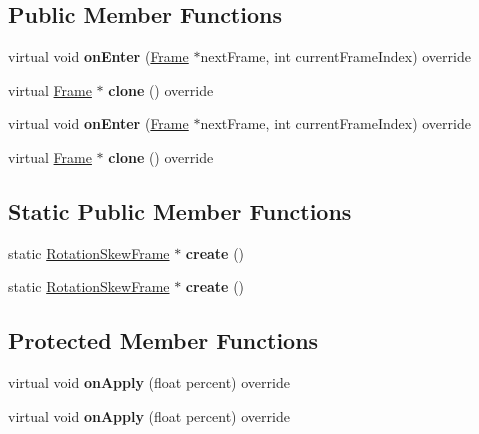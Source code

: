 \subsection*{Public Member Functions}
\begin{DoxyCompactItemize}
\item 
\mbox{\label{classRotationSkewFrame_a8557ecb6480104386fc7bae96d6990a8}} 
virtual void {\bfseries on\+Enter} (\hyperlink{classFrame}{Frame} $\ast$next\+Frame, int current\+Frame\+Index) override
\item 
\mbox{\label{classRotationSkewFrame_a4693ecc28a212a06f3c65157ee5cf5d1}} 
virtual \hyperlink{classFrame}{Frame} $\ast$ {\bfseries clone} () override
\item 
\mbox{\label{classRotationSkewFrame_a608836b94d9d31580a8bfa9494816508}} 
virtual void {\bfseries on\+Enter} (\hyperlink{classFrame}{Frame} $\ast$next\+Frame, int current\+Frame\+Index) override
\item 
\mbox{\label{classRotationSkewFrame_a02f67718cf4e0adaf988641a7cdcbe68}} 
virtual \hyperlink{classFrame}{Frame} $\ast$ {\bfseries clone} () override
\end{DoxyCompactItemize}
\subsection*{Static Public Member Functions}
\begin{DoxyCompactItemize}
\item 
\mbox{\label{classRotationSkewFrame_ac32558effacb66c619fe702d53de0025}} 
static \hyperlink{classRotationSkewFrame}{Rotation\+Skew\+Frame} $\ast$ {\bfseries create} ()
\item 
\mbox{\label{classRotationSkewFrame_a2fe97b6fc100164843dc540ed0ea81ca}} 
static \hyperlink{classRotationSkewFrame}{Rotation\+Skew\+Frame} $\ast$ {\bfseries create} ()
\end{DoxyCompactItemize}
\subsection*{Protected Member Functions}
\begin{DoxyCompactItemize}
\item 
\mbox{\label{classRotationSkewFrame_a5124b2b5a6c2f0e4857f728ad2e43528}} 
virtual void {\bfseries on\+Apply} (float percent) override
\item 
\mbox{\label{classRotationSkewFrame_a4e50952848fe25d9fcf9edf3387fc1e7}} 
virtual void {\bfseries on\+Apply} (float percent) override
\end{DoxyCompactItemize}
